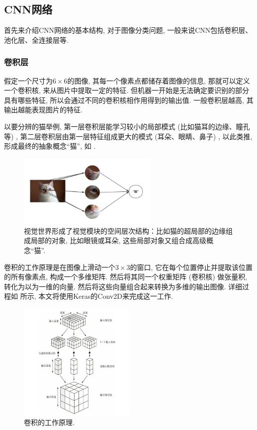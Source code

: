 \documentclass[lang=cn,11pt]{elegantpaper}
\begin{document}
\subsection{CNN网络}
首先来介绍CNN网络的基本结构, 对于图像分类问题, 一般来说CNN包括卷积层、池化层、全连接层等. 
\subsubsection*{卷积层}
假定一个尺寸为$6\times 6$的图像, 其每一个像素点都储存着图像的信息, 那就可以定义一个卷积核, 来从图片中提取一定的特征. 但机器一开始是无法确定要识别的部分具有哪些特征, 所以会通过不同的卷积核相作用得到的输出值. 一般卷积层越高, 其输出越能表现图片的特征. 

以要分辨的猫举例, 第一层卷积层能学习较小的局部模式 (比如猫耳的边缘、瞳孔等) , 第二层卷积层由第一层特征组成更大的模式 (耳朵、眼睛、鼻子) , 以此类推, 形成最终的抽象概念“猫”, 如 . 
\tiny
\begin{figure}[htbp]
	\centering
  \includegraphics[width=0.6\textwidth]{cat1}
  \caption{视觉世界形成了视觉模块的空间层次结构：比如猫的超局部的边缘组成局部的对象, 比如眼镜或耳朵, 这些局部对象又组合成高级概念“猫”.\label{fig:cat1}}
\end{figure}

\normalsize
卷积的工作原理是在图像上滑动一个$3\times 3$的窗口, 它在每个位置停止并提取该位置的所有像素点, 构成一个多维矩阵. 然后将其同一个权重矩阵 (卷积核) 做张量积, 转化为以为一维的向量. 然后将这些向量组合起来转换为多维的输出图像. 详细过程如  所示, 本文将使用Keras的Conv2D来完成这一工作. 
\begin{figure}[htbp]
	\centering
  \includegraphics[width=0.5\textwidth]{conv1.png}
  \caption{卷积的工作原理.\label{fig:conv1}}
\end{figure}
\end{document}
